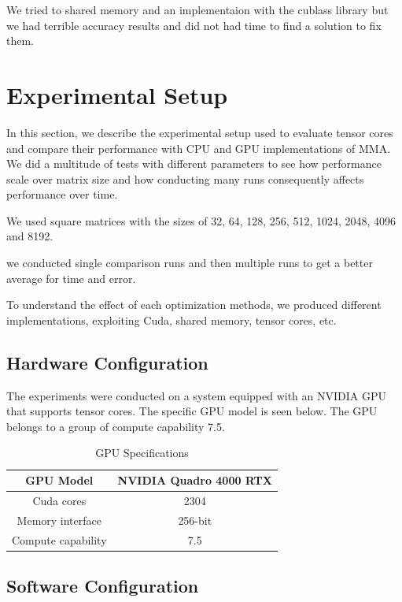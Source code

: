 \documentclass[conference]{IEEEtran}
\begin{document}
  We tried to shared memory and an implementaion with the cublass library but we had terrible 
  accuracy results and did not had time to find a solution to fix them. 

  \section{Experimental Setup}\label{sec:experimental-setup}
  
  In this section, we describe the experimental setup used to evaluate 
  tensor cores and compare their performance with CPU and GPU implementations of MMA.
  We did a multitude of tests with different parameters to see how performance scale over matrix size
  and how conducting many runs consequently affects performance over time.

  We used square matrices with the sizes of 32, 64, 128, 256, 512, 1024, 2048, 4096 and 8192.

  we conducted single comparison runs and then multiple runs to get a better average for time and error.
  
  To understand the effect of each optimization methods, we produced different implementations, exploiting 
  Cuda, shared memory, tensor cores, etc.

  \subsection{Hardware Configuration}\label{sec:hardware-configuration}
  
  The experiments were conducted on a system equipped with an NVIDIA GPU that supports tensor cores.
  The specific GPU model is seen below. The GPU belongs to a group of compute capability 7.5. 
  
  \begin{table}[htbp]
  \caption{GPU Specifications\cite{Voltatuningguide}}
  \centering
    \begin{tabular}{|c|c|}
    \hline
    GPU Model & NVIDIA Quadro 4000 RTX \\
    \hline
    Cuda cores & 2304 \\
    \hline
    Memory interface & 256-bit \\
    \hline
    Compute capability & 7.5 \\
    \hline
    
  \end{tabular}
  \end{table}
  
  \subsection{Software Configuration}\label{sec:software-configuration}
  
\end{document}
